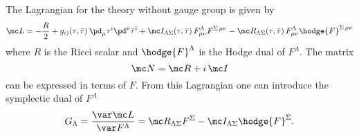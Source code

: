 The Lagrangian for the theory without gauge group is given by
\begin{equation}
	\mc L = - \frac{R}{2}
		+ g_{i\bar\jmath}(\tau, \bar \tau)\, \pd_\mu \tau^i \pd^\nu \bar\tau^{\bar\imath}
		+ \mc I_{\Lambda\Sigma}(\tau, \bar \tau)\, F^\Lambda_{\mu\nu} F^{\Sigma\,\mu\nu}
		- \mc R_{\Lambda\Sigma}(\tau, \bar \tau)\, F^\Lambda_{\mu\nu} \hodge{F}^{\Sigma\,\mu\nu}
\end{equation} 
where $R$ is the Ricci scalar and $\hodge{F}^\Lambda$ is the Hodge dual of $F^\Lambda$.
The matrix
\begin{equation}
	\mc N = \mc R + i\, \mc I
\end{equation} 
can be expressed in terms of $F$.
From this Lagrangian one can introduce the symplectic dual of $F^\Lambda$
\begin{equation}
	G_\Lambda = \frac{\var \mc L}{\var F^\Lambda} = \mc R_{\Lambda\Sigma} F^\Sigma - \mc I_{\Lambda\Sigma} \hodge{F}^\Sigma.
\end{equation} 
